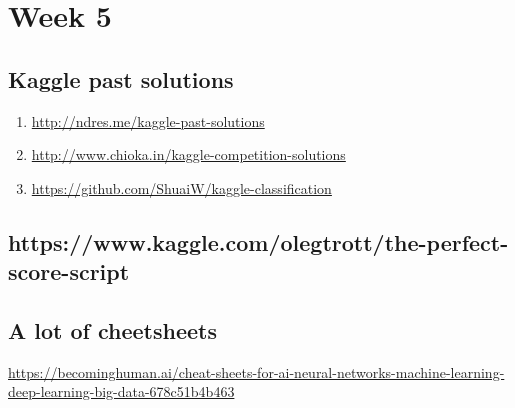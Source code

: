 \documentclass[11pt, twoside]{article}   	%
\begin{document}
\pagebreak
\section{Week 5}
\subsection{Kaggle past solutions}
\begin{enumerate}
    \item \url{http://ndres.me/kaggle-past-solutions}
    \item \url{http://www.chioka.in/kaggle-competition-solutions}
    \item \url{https://github.com/ShuaiW/kaggle-classification}
 \end{enumerate}    
\subsection{https://www.kaggle.com/olegtrott/the-perfect-score-script}
\subsection{A lot of cheetsheets}
\url{https://becominghuman.ai/cheat-sheets-for-ai-neural-networks-machine-learning-deep-learning-big-data-678c51b4b463}
\end{document}
